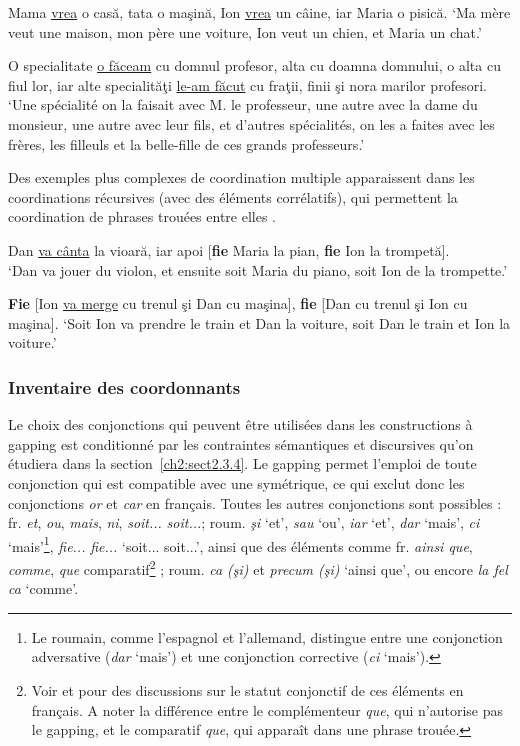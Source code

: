 \ea
\ea Mama \uline{vrea} o casă, tata o maşină, Ion \uline{vrea} un câine, iar Maria o pisică. \label{ch2:ex50a}
\glt ‘Ma mère veut une maison, mon père une voiture, Ion veut un chien, et Maria un chat.’

\ex O specialitate \uline{o făceam} cu domnul profesor, alta cu doamna domnului, o alta cu fiul lor, iar alte specialităţi \uline{le-am făcut} cu fraţii, finii şi nora marilor profesori. \label{ch2:ex50b}\\
\glt ‘Une spécialité on la faisait avec M. le professeur, une autre avec la dame du monsieur, une autre avec leur fils, et d’autres spécialités, on les a faites avec les frères, les filleuls et la belle-fille de ces grands professeurs.’   
\z
\z

Des exemples plus complexes de coordination multiple apparaissent dans les coordinations récursives (avec des éléments corrélatifs), qui permettent la coordination de phrases trouées entre elles .

\ea \label{ch2:ex51}
\ea Dan \uline{va cânta} la vioară, iar apoi [\textbf{fie} Maria la pian, \textbf{fie} Ion la trompetă].\\
\glt ‘Dan va jouer du violon, et ensuite soit Maria du piano, soit Ion de la trompette.’ 

\ex \textbf{Fie} [Ion \uline{va merge} cu trenul şi Dan cu maşina], \textbf{fie} [Dan cu trenul şi Ion cu maşina].
\glt ‘Soit Ion va prendre le train et Dan la voiture, soit Dan le train et Ion la voiture.’ \z
\z


\subsubsection{Inventaire des coordonnants}

Le choix des conjonctions qui peuvent être utilisées dans les constructions à gapping est conditionné par les contraintes sémantiques et discursives qu’on étudiera dans la section~\ref{ch2:sect2.3.4}. Le gapping permet l’emploi de toute conjonction qui est compatible avec une  symétrique, ce qui exclut donc les conjonctions \textit{or} et \textit{car} en français. Toutes les autres conjonctions sont possibles : fr. \textit{et}, \textit{ou}, \textit{mais}, \textit{ni}, \textit{soit...} \textit{soit...}; roum. \textit{şi} ‘et’, \textit{sau} ‘ou’, \textit{iar} ‘et’, \textit{dar} ‘mais’, \textit{ci} ‘mais’\footnote{
 Le roumain, comme l’espagnol et l’allemand, distingue entre une conjonction adversative (\textit{dar} ‘mais’) et une conjonction corrective (\textit{ci} ‘mais’).}, \textit{fie...} \textit{fie...} ‘soit... soit...’, ainsi que des éléments comme fr. \textit{ainsi que}, \textit{comme}, \textit{que} comparatif\footnote{
 Voir \citet{Mouret2007} et \citet{MouretEtAl2008} pour des discussions sur le statut conjonctif de ces éléments en français. A noter la différence entre le complémenteur \textit{que}, qui n’autorise pas le gapping, et le comparatif \textit{que}, qui apparaît dans une phrase trouée.} ; roum. \textit{ca (şi)} et \textit{precum (şi)} ‘ainsi que’, ou encore \textit{la fel ca} ‘comme’. 

